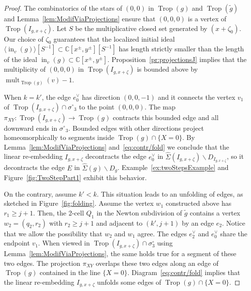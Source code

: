 \documentclass[11pt]{amsart}
\numberwithin{equation}{section}
\theoremstyle{plain}
\theoremstyle{definition}
\theoremstyle{remark}
\begin{document}
\begin{proof}
  The combinatorics of the stars of $(0,0)$ in $\operatorname{Trop}(g)$ and
  $\operatorname{Trop}(\tilde{g})$ and Lemma~\ref{lem:ModifViaProjections} ensure
  that $(0,0,0)$ is a vertex of $\operatorname{Trop}(I_{g,x+{\zeta}})$. Let $S$ be the
  multiplicative closed set generated by $(x+{\zeta}_0)$. Our choice of
  ${\zeta}_0$ guarantees that the localized initial ideal $\langle
  \operatorname{in}_{v}(g)\rangle[S^{-1}]\subset {\mathbb{C}}[x^{\pm}, y^{\pm}] [S^{-1}]$
  has length strictly smaller than the length of the ideal
  $\operatorname{in}_{v}(g)\subset {\mathbb{C}}[x^{\pm},
  y^{\pm}]$. Proposition~\ref{pr:projectionsJ} implies that the
  multiplicity of $(0,0,0)$ in $\operatorname{Trop}(I_{g,x+{\zeta}})$ is bounded above
  by $\operatorname{mult}_{\operatorname{Trop}(g)}(v)-1$.  \smallskip

  When $k=k'$, the edge $e_0^{\vee}$ has direction $(0,0,-1)$ and it
  connects the vertex $v_1$ of $\operatorname{Trop}(I_{g,x+{\zeta}})\cap {\sigma^{\circ}}_3$ to
  the point $(0,0,0)$.  The map $\pi_{XY}\colon\operatorname{Trop}(I_{g,x+{\zeta}})
  \rightarrow \operatorname{Trop}(g)$ contracts this bounded edge and all downward
  ends in ${\sigma^{\circ}}_3$. Bounded edges with other directions project
  homeomorphically to segments inside $\operatorname{Trop}(g)\cap\{X=0\}$. By
  Lemma~\ref{lem:ModifViaProjections} and~\eqref{eq:contr/fold} we
  conclude that the linear re-embedding $I_{g,x+{\zeta}}$ decontracts the
  edge $e_0^{\vee}$ in $\widehat{\Sigma}(I_{g,x+{\zeta}})\smallsetminus
  D_{I_{g,x+{\zeta}}}$, so it decontracts the edge $E$ in
  $\widehat{\Sigma}(g)\smallsetminus
  D_g$. Example~\ref{ex:twoStepsExample} and
  Figure~\ref{fig:TwoStepPart1} exhibit this behavior.

  On the contrary, assume $k'<k$. This situation leads to an unfolding
  of edges, as sketched in Figure~\ref{fig:folding}. Assume the vertex
  $w_1$ constructed above has $r_1\geq j+1$. Then, the 2-cell $Q_1$ in
  the Newton subdivision of $\tilde{g}$ contains a vertex
  $w_{2}=(q_{2},r_{2})$ with $r_{2}\geq j+1$ and adjacent to
  $(k',j+1)$ by an edge $e_{2}$.  Notice that we allow the possibility
  that $w_{2}$ and $w_1$ agree. The edges $e_{2}^{\vee}$ and
  $e_0^{\vee}$ share the endpoint $v_1$. When viewed in
  $\operatorname{Trop}(I_{g,x+{\zeta}})\cap \sigma_3^{\circ}$ using
  Lemma~\ref{lem:ModifViaProjections}, the same holds true for a
  segment of these two edges. The projection $\pi_{XY}$ overlaps these
  two edges along an edge of $\operatorname{Trop}(g)$ contained in the line
  $\{X=0\}$.  Diagram~\eqref{eq:contr/fold} implies that the linear
  re-embedding $I_{g,x+{\zeta}}$ unfolds some edges of $\operatorname{Trop}(g)\cap
  \{X=0\}$.


\end{proof}
\end{document}
